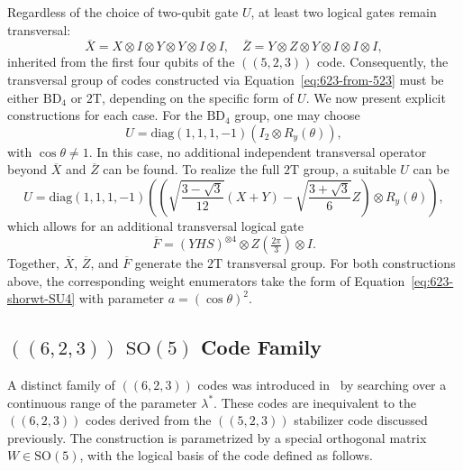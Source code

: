 \documentclass[8pt]{article}
\theoremstyle{definition}
\begin{document}
Regardless of the choice of two-qubit gate \(U\), at least two logical gates remain transversal:
\[ \overline{X}=X\otimes I\otimes Y\otimes Y\otimes I\otimes I,\quad \overline{Z}=Y\otimes Z\otimes Y\otimes I\otimes I\otimes I,\]
inherited from the first four qubits of the \(((5,2,3))\) code. Consequently, the transversal group of codes constructed via Equation~\eqref{eq:623-from-523} must be either \(\mathrm{BD}_4\) or \(2\mathrm{T}\), depending on the specific form of \(U\). We now present explicit constructions for each case. For the \(\mathrm{BD}_4\) group, one may choose
\[ U=\mathrm{diag}\left(1,1,1,-1\right)\left(I_{2}\otimes R_{y}\left(\theta\right)\right), \]
with \(\cos\theta \neq 1\). In this case, no additional independent transversal operator beyond \(\overline{X}\) and \(\overline{Z}\) can be found. To realize the full \(2\mathrm{T}\) group, a suitable \(U\) can be
\[ U=\mathrm{diag}\left(1,1,1,-1\right)\left(\left( \sqrt{\frac{3-\sqrt{3}}{12}} (X+Y)- \sqrt{\frac{3+\sqrt{3}}{6}}Z\right)\otimes R_{y}\left(\theta\right)\right), \]
which allows for an additional transversal logical gate
\[\overline{F} = (YHS)^{\otimes 4} \otimes Z\left(\tfrac{2\pi}{3}\right) \otimes I.\]
Together, \(\overline{X}\), \(\overline{Z}\), and \(\overline{F}\) generate the \(2\mathrm{T}\) transversal group. For both constructions above, the corresponding weight enumerators take the form of Equation~\eqref{eq:623-shorwt-SU4} with parameter \(a = (\cos\theta)^2\).

\subsection{\texorpdfstring{$((6,2,3))$}{((6,2,3))} \texorpdfstring{$\mathrm{SO}(5)$}{SO(5)} Code Family}

A distinct family of \(((6,2,3))\) codes was introduced in~\cite{du2024characterizing} by searching over a continuous range of the parameter \(\lambda^*\). These codes are inequivalent to the \(((6,2,3))\) codes derived from the \(((5,2,3))\) stabilizer code discussed previously. The construction is parametrized by a special orthogonal matrix \(W \in \mathrm{SO}(5)\), with the logical basis of the code defined as follows.
\end{document}
